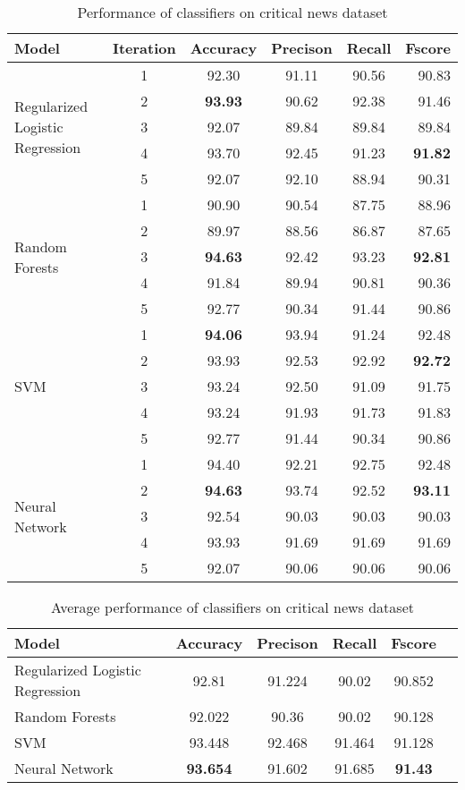 \begin{table}
\begin{center}
\caption{Performance of classifiers on critical news dataset}
\label{tbl:critical_news_performance}
\begin{tabular}{@{}lccccr@{}}
\toprule 
Model&Iteration&Accuracy&Precison&Recall&Fscore\\
\midrule 
\multirow{5}{*}{Regularized Logistic Regression}
&1&92.30&91.11&90.56&90.83\\
&2&\textbf{93.93}&90.62&92.38&91.46\\
&3&92.07&89.84&89.84&89.84\\
&4&93.70&92.45&91.23&\textbf{91.82}\\
&5&92.07&92.10&88.94&90.31\\
\hline
\multirow{5}{*}{Random Forests}
&1&90.90&90.54&87.75&88.96\\
&2&89.97&88.56&86.87&87.65\\
&3&\textbf{94.63}&92.42&93.23&\textbf{92.81}\\
&4&91.84&89.94&90.81&90.36\\
&5&92.77&90.34&91.44&90.86\\
\hline
\multirow{5}{*}{SVM}
&1&\textbf{94.06}&93.94&91.24&92.48\\
&2&93.93&92.53&92.92&\textbf{92.72}\\
&3&93.24&92.50&91.09&91.75\\
&4&93.24&91.93&91.73&91.83\\
&5&92.77&91.44&90.34&90.86\\
\hline
\multirow{5}{*}{Neural Network}
&1&94.40&92.21&92.75&92.48\\
&2&\textbf{94.63}&93.74&92.52&\textbf{93.11}\\
&3&92.54&90.03&90.03&90.03\\
&4&93.93&91.69&91.69&91.69\\
&5&92.07&90.06&90.06&90.06\\
\bottomrule
\end{tabular}
\end{center}
\end{table}

\begin{table}
\begin{center}
\caption{Average performance of classifiers on critical news dataset}
\label{tbl:average_performance}
\begin{tabular}{@{}lccccc@{}}
\toprule 
Model&Accuracy&Precison&Recall&Fscore\\
\midrule 
Regularized Logistic Regression&92.81&91.224&90.02&90.852\\
Random Forests&92.022&90.36&90.02&90.128\\
SVM&93.448&92.468&91.464&91.128\\
Neural Network&\textbf{93.654}&91.602&91.685&\textbf{91.43}\\
\bottomrule
\end{tabular}
\end{center}
\end{table}

